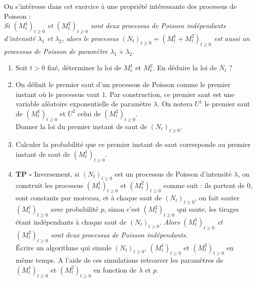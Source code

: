 \documentclass[solutions]{exercices}
\begin{document}
\begin{exercice}
On s'intéresse dans cet exercice à une propriété intéressante des processus de Poisson :\\
\textit{Si $(M^1_t)_{t\ge0}$ et $(M^2_t)_{t\ge0}$ sont deux processus de Poisson indépendants d'intensité $\lambda_1$ et $\lambda_2$, alors  le processus $(N_t)_{t\ge0}=(M^1_t+M^2_t)_{t\ge0}$ est aussi un processus de Poisson de paramètre $\lambda_1+\lambda_2$.}
\begin{enumerate}
\item Soit $t>0$ fixé, déterminer la loi de $M^1_t$ et $M^2_t$. En déduire la loi de $N_t$ ?
\item On définit le premier saut d'un processus de Poisson comme le premier instant où le processus vaut $1$. Par construction, ce premier saut est une variable aléatoire exponentielle de paramètre $\lambda$. On notera $U^1$ le premier saut de $(M^1_t)_{t\ge0}$ et $U^2$ celui de $(M^2_t)_{t\ge0}$. \\
Donner la loi du premier instant de saut de $(N_t)_{t\ge0}$.
\item Calculer la probabilité que ce premier instant de saut corresponde au premier instant de saut de $(M^1_t)_{t\ge0}$.
\item \textbf{TP -} Inversement, si $(N_t)_{t\ge0}$ est un processus de Poisson d'intensité $\lambda$, on construit les processus $(M^1_t)_{t\ge0}$ et $(M^2_t)_{t\ge0}$ comme suit : ils partent de $0$, sont constants par morceau, et à chaque saut de $(N_t)_{t\ge0}$, on fait sauter $(M^1_t)_{t\ge0}$ avec probabilité $p$, sinon c'est $(M^2_t)_{t\ge0}$ qui saute, les tirages étant indépendants à chaque saut de $(N_t)_{t\ge0}$. \textit{Alors $(M^1_t)_{t\ge0}$ et $(M^2_t)_{t\ge0}$ sont deux processus de Poisson indépendants.}\\
\'Ecrire un algorithme qui simule $(N_t)_{t\ge0}$, $(M^1_t)_{t\ge0}$ et $(M^2_t)_{t\ge0}$ en même temps. A l'aide de ces simulations retrouver les paramètres de $(M^1_t)_{t\ge0}$ et $(M^2_t)_{t\ge0}$ en fonction de $\lambda$ et $p$.
\end{enumerate}
\end{exercice}
\end{document}
